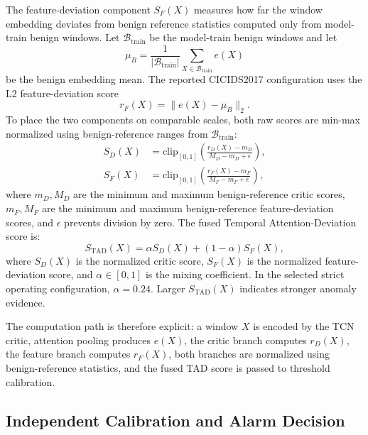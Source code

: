 The feature-deviation component \(S_F(X)\) measures how far the window embedding deviates from benign reference statistics computed only from model-train benign windows. Let \(\mathcal{B}_{\mathrm{train}}\) be the model-train benign windows and let
\begin{equation}
\mu_B=\frac{1}{|\mathcal{B}_{\mathrm{train}}|}\sum_{X\in\mathcal{B}_{\mathrm{train}}} e(X)
\end{equation}
be the benign embedding mean. The reported CICIDS2017 configuration uses the L2 feature-deviation score
\begin{equation}
r_F(X)=\|e(X)-\mu_B\|_2 .
\end{equation}
To place the two components on comparable scales, both raw scores are min-max normalized using benign-reference ranges from \(\mathcal{B}_{\mathrm{train}}\):
\begin{align}
S_D(X)&=\mathrm{clip}_{[0,1]}
\left(\frac{r_D(X)-m_D}{M_D-m_D+\epsilon}\right),\\
S_F(X)&=\mathrm{clip}_{[0,1]}
\left(\frac{r_F(X)-m_F}{M_F-m_F+\epsilon}\right),
\end{align}
where \(m_D,M_D\) are the minimum and maximum benign-reference critic scores, \(m_F,M_F\) are the minimum and maximum benign-reference feature-deviation scores, and \(\epsilon\) prevents division by zero. The fused Temporal Attention-Deviation score is:
\begin{equation}
S_{\mathrm{TAD}}(X)=\alpha S_D(X)+(1-\alpha)S_F(X),
\end{equation}
where \(S_D(X)\) is the normalized critic score, \(S_F(X)\) is the normalized feature-deviation score, and \(\alpha\in[0,1]\) is the mixing coefficient. In the selected strict operating configuration, \(\alpha=0.24\). Larger \(S_{\mathrm{TAD}}(X)\) indicates stronger anomaly evidence.

The computation path is therefore explicit: a window \(X\) is encoded by the TCN critic, attention pooling produces \(e(X)\), the critic branch computes \(r_D(X)\), the feature branch computes \(r_F(X)\), both branches are normalized using benign-reference statistics, and the fused TAD score is passed to threshold calibration.

\subsection{Independent Calibration and Alarm Decision}

